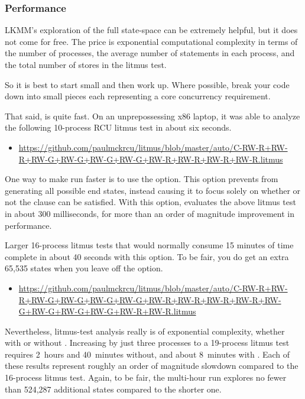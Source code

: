 \subsubsection{Performance}

LKMM's exploration of the full state-space can be extremely helpful,
but it does not come for free.
The price is exponential computational complexity in terms of the number
of processes, the average number of statements in each process, and the
total number of stores in the litmus test.

So it is best to start small and then work up.
Where possible, break your code down into small pieces each representing
a core concurrency requirement.

That said,  is quite fast.
On an unprepossessing x86 laptop, it was able to analyze the following
10-process RCU litmus test in about six seconds.

\begin{itemize}
\item \url{https://github.com/paulmckrcu/litmus/blob/master/auto/C-RW-R+RW-R+RW-G+RW-G+RW-G+RW-G+RW-R+RW-R+RW-R+RW-R.litmus}
\end{itemize}

One way to make  run faster is to use the 
option.
This option prevents  from generating all possible end states,
instead causing it to focus solely on whether or not the 
clause can be satisfied.
With this option,  evaluates the above litmus test in
about 300 milliseconds, for more than an order of magnitude improvement
in performance.

Larger 16-process litmus tests that would normally consume 15 minutes
of time complete in about 40 seconds with this option.
To be fair, you do get an extra 65,535 states when you leave off the
 option.

\begin{itemize}
\item \url{https://github.com/paulmckrcu/litmus/blob/master/auto/C-RW-R+RW-R+RW-G+RW-G+RW-G+RW-G+RW-R+RW-R+RW-R+RW-R+RW-G+RW-G+RW-G+RW-G+RW-R+RW-R.litmus}
\end{itemize}
    
Nevertheless, litmus-test analysis really is of exponential complexity,
whether with or without .
Increasing by just three processes to a 19-process litmus test requires
2~hours and 40~minutes without, and about 8~minutes with .
Each of these results represent roughly an order of magnitude slowdown
compared to the 16-process litmus test.
Again, to be fair, the multi-hour run explores no fewer than 524,287
additional states compared to the shorter one.

